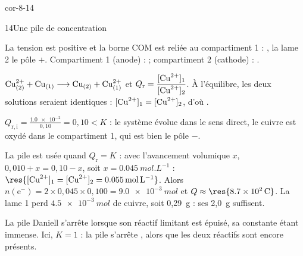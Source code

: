 \begin{blocLivre}{cor-8-14}
\begin{corrige}{14}{Une pile de concentration}
\begin{questions}
\item La tension est positive et la borne COM est reliée au compartiment 1 : , la lame 2
le pôle $+$. Compartiment 1 (anode) :  ; compartiment 2 (cathode) : .
\item $\ce{Cu^2+}_{(2)}+\ce{Cu}_{(1)}\longrightarrow\ce{Cu}_{(2)}+\ce{Cu^2+}_{(1)}$ et
$Q_\mathrm{r}=\dfrac{[\ce{Cu^2+}]_1}{[\ce{Cu^2+}]_2}$. À l'équilibre, les deux solutions seraient identiques :
$[\ce{Cu^2+}]_1=[\ce{Cu^2+}]_2$, d'où .
\item $Q_{\mathrm{r},\mathrm{i}}=\frac{\num{1.0e-2}}{0{,}10}=0{,}10<K$ : le système évolue dans le sens direct, le cuivre est oxydé
dans le compartiment 1, qui est bien le pôle $-$.
\item La pile est usée quand $Q_\mathrm{r}=K$ : avec l'avancement volumique $x$, $0{,}010+x=0{,}10-x$, soit
$x=\qty{0,045}{mol.L^{-1}}$ : $\res{[\ce{Cu^2+}]_1=[\ce{Cu^2+}]_2=\qty{0,055}{mol.L^{-1}}}$. Alors
$n(\mathrm{e}^-)=2\times0{,}045\times0{,}100=\qty{9,0e-3}{mol}$ et $Q\approx\res{\qty{8,7e2}{C}}$. La lame 1 perd
$\qty{4,5e-3}{mol}$ de cuivre, soit 0,29~g : ses 2,0~g suffisent.
\item La pile Daniell s'arrête lorsque son réactif limitant est épuisé, sa constante étant immense. Ici, $K=1$ : la pile
s'arrête , alors que les deux réactifs sont encore présents.
\end{questions}
\end{corrige}
\end{blocLivre}
